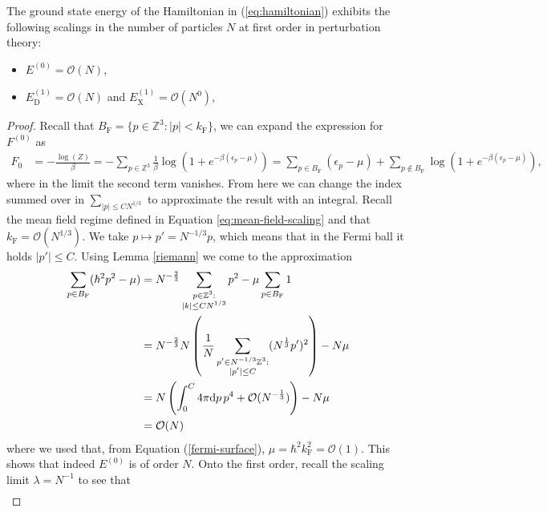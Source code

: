 \begin{theorem}
	\label{thm:main-result}
	The ground state energy of the Hamiltonian in (\ref{eq:hamiltonian}) exhibits the
	following scalings in the number of particles $N$ at first order in perturbation theory:
	\begin{itemize}
		\item $E^{(0)} = \mathcal{O}(N)$,
		\item $E_{\mathrm{D}}^{(1)} = \mathcal{O}(N)$ and $E_{\mathrm{X}}^{(1)} = \mathcal{O}(N^0)$,
	\end{itemize}
\end{theorem}
\begin{proof}
	Recall that $B_{\mathrm{F}}=\{p\in\mathbb{Z}^3:\vert p\vert<k_{\mathrm{F}}\}$, we can
	expand the expression for $F^{(0)}$ as
	\begin{align*}
		F_0
		&= -\frac{\log(Z)}{\beta} = -\sum_{p\in\mathbb{Z}^3} \frac{1}{\beta}\log(1+e^{-\beta(\epsilon_p-\mu)})
		= \sum_{p\in B_{\mathrm{F}}}(\epsilon_p-\mu) + \sum_{p\not\in B_{\mathrm{F}}}\log(1+e^{-\beta(\epsilon_p-\mu)}),
	\end{align*}
	where in the limit the second term vanishes. From here we can change the index summed over
	in $\sum_{\vert p\vert\leq CN^{1/3}}$ to approximate the result with an integral. Recall
	the mean field regime defined in Equation \eqref{eq:mean-field-scaling} and that
	$k_{\mathrm{F}}= \mathcal{O}(N^{1/3})$. We take $p\mapsto p'=N^{-1/3}p$, which means that
	in the Fermi ball it holds $\vert p'\vert\leq C$. Using Lemma \ref{riemann} we come to the
	approximation
	\begin{align*}
		\sum_{p\in B_{\mathrm{F}}}(\hbar^2p^2-\mu)
		&= N^{-\frac{2}{3}}\sum_{\substack{p\in\mathbb{Z}^3:\\\vert k\vert\leq CN^{1/3}}}p^2 -\mu\sum_{p\in B_{\mathrm{F}}}1\\
		&= N^{-\frac{2}{3}}N\left(\frac{1}{N}\sum_{\substack{p'\in N^{-1/3}\mathbb{Z}^3:\\\vert p'\vert\leq C}} (N^{\frac{1}{3}}p')^2\right)-N\mu\\
		&= N \left(\int_0^C 4\pi\mathrm{d} p\,p^4 + \mathcal{O}(N^{-\frac{1}{3}})\right) -N\mu\\
		&= \mathcal{O}(N)
	\end{align*}
	where we used that, from Equation (\ref{fermi-surface}), $\mu=\hbar^2k_{\mathrm{F}}^2=
	\mathcal{O}(1)$. This shows that indeed $E^{(0)}$ is of order $N$. Onto the first order,
	recall the scaling limit $\lambda=N^{-1}$ to see that
	\begin{align*}

\end{align*}
\end{proof}
